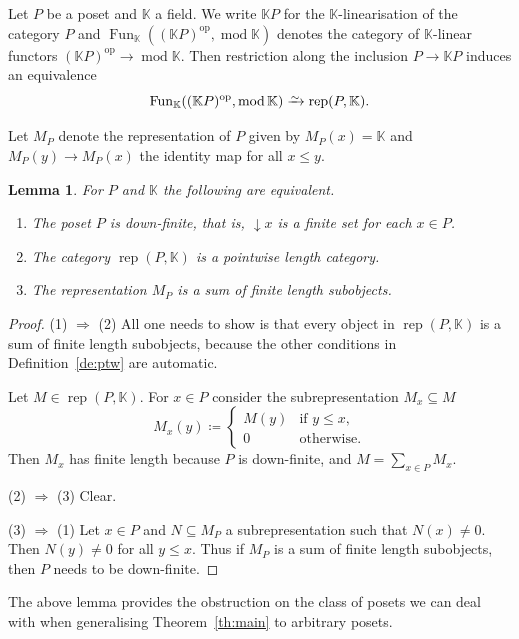 \documentclass[a4paper]{amsart}
\theoremstyle{plain}
\newtheorem{lem}[thm]{Lemma}
\theoremstyle{definition}
\theoremstyle{remark}
\numberwithin{equation}{section}
\newcommand{\Fun}{\operatorname{Fun}}
\renewcommand{\mod}{\operatorname{mod}}
\newcommand{\rep}{\operatorname{rep}}
\newcommand{\op}{\mathrm{op}}
\newcommand{\iso}{\xrightarrow{\raisebox{-.4ex}[0ex][0ex]{$\scriptstyle{\sim}$}}}
\def\bbK{\mathbb K}
\begin{document}
Let $P$ be a poset and $\bbK$ a field. We write $\bbK P$ for the
$\bbK$-linearisation of the category $P$ and
$\Fun_\bbK((\bbK P)^\op,\mod\bbK)$ denotes the category of
$\bbK$-linear functors $(\bbK P)^\op\to\mod\bbK$. Then restriction
along the inclusion $P\to\bbK P$ induces an equivalence
\[\Fun_\bbK((\bbK P)^\op,\mod\bbK)\iso\rep(P,\bbK).\]

Let $M_P$ denote the representation of $P$ given by $M_P(x)=\bbK$ and
$M_P(y)\to M_P(x)$ the identity map for all $x\le y$.

\begin{lem}\label{le:downfinite}
For $P$  and $\bbK$ the following are equivalent.
\begin{enumerate}
\item The poset $P$ is down-finite, that is,
  $\downarrow\! x$ is a finite set for each $x\in P$.
\item The category $\rep(P,\bbK)$ is a pointwise length category.
\item The representation $M_P$  is a sum of finite length subobjects. 
\end{enumerate}
\end{lem}
\begin{proof}
  (1) $\Rightarrow$ (2) All one needs to show is that every object in
  $\rep(P,\bbK)$ is a sum of finite length subobjects, because the
  other conditions in Definition~\ref{de:ptw} are automatic.

  Let $M\in \rep(P,\bbK)$. For $x\in P$ consider
  the subrepresentation $M_x\subseteq M$
\[M_x(y)\coloneqq \begin{cases} M(y)&\text{if }y\le x,\\
    0& \text{otherwise}.
\end{cases}\]
Then $M_x$ has finite length because  $P$ is down-finite, and
$M=\sum_{x\in P}M_x$.

(2) $\Rightarrow$ (3) Clear.
 
 (3) $\Rightarrow$ (1) Let $x\in P$ and $N\subseteq M_P$ a
 subrepresentation such that $N(x)\neq 0$. Then $N(y)\neq 0$ for all
 $y\le x$.  Thus if $M_P$ is a sum of finite length subobjects, then
 $P$ needs to be down-finite.
\end{proof}

The above lemma provides the obstruction on the class of posets we can
deal with when generalising Theorem~\ref{th:main} to arbitrary posets.
\end{document}
